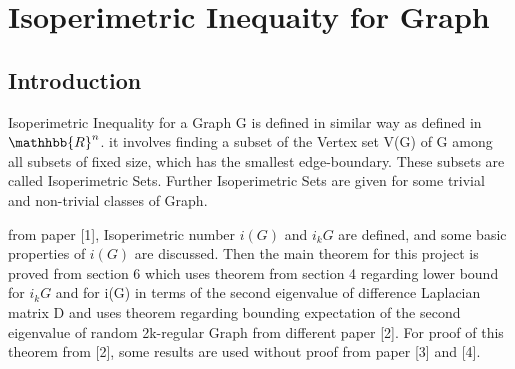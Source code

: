 \documentclass[oneside]{book}
\theoremstyle{definition}
\begin{document}
    
    
    
    
    
    
    
    
    
    
    
    
    
    
    
    
    
    
    
    
    
    
    
    
    
    
    
    
    
    
    
    
    
    
    
    
    \chapter{Isoperimetric Inequaity for Graph}
    \section{Introduction}
  
 
  Isoperimetric Inequality for a Graph G is defined in similar way as defined in $\mathhbb{R}^n$. it involves finding a subset of the Vertex set V(G) of G among all subsets of fixed size, which has the smallest edge-boundary. These subsets are called Isoperimetric Sets. Further  Isoperimetric Sets are given for some trivial and non-trivial classes of Graph. \par 
    from paper [1], Isoperimetric number $i(G)$ and $i_k{G}$ are defined, and some basic properties of $i(G)$  are discussed. Then the main theorem for this project is proved from section 6 which uses theorem from section 4 regarding lower bound for $i_k{G}$ and for i(G) in terms of the second eigenvalue of difference Laplacian matrix D and uses theorem regarding bounding expectation of the second eigenvalue of random 2k-regular Graph from different paper [2]. For proof of this theorem from [2], some results are used without proof from paper [3] and [4].\par
  
\end{document}
